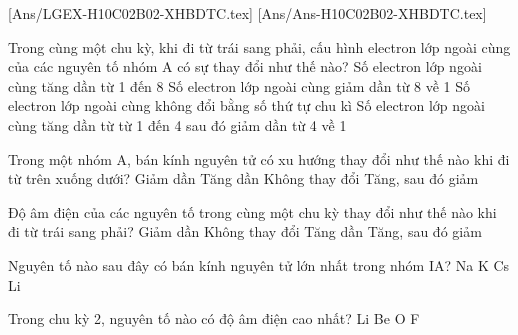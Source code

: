 [Ans/LGEX-H10C02B02-XHBDTC.tex]
[Ans/Ans-H10C02B02-XHBDTC.tex]

\begin{ex}%
	Trong cùng một chu kỳ, khi đi từ trái sang phải, cấu hình electron lớp ngoài cùng của các nguyên tố nhóm A có sự thay đổi như thế nào?
	\choice
	{\True Số electron lớp ngoài cùng tăng dần từ 1 đến 8}
	{Số electron lớp ngoài cùng giảm dần từ 8 về 1}
	{Số electron lớp ngoài cùng không đổi bằng số thứ tự chu kì}
	{Số electron lớp ngoài cùng tăng dần từ từ 1 đến 4 sau đó giảm dần từ 4 về 1}
\end{ex}
\begin{ex}%
	Trong một nhóm A, bán kính nguyên tử có xu hướng thay đổi như thế nào khi đi từ trên xuống dưới?
	\choice
	{Giảm dần}
	{\True Tăng dần}
	{Không thay đổi}
	{Tăng, sau đó giảm}
\end{ex}
\begin{ex}%
	Độ âm điện của các nguyên tố trong cùng một chu kỳ thay đổi như thế nào khi đi từ trái sang phải?
	\choice
	{Giảm dần}
	{Không thay đổi}
	{\True Tăng dần}
	{Tăng, sau đó giảm}
\end{ex}
\begin{ex}%
	Nguyên tố nào sau đây có bán kính nguyên tử lớn nhất trong nhóm IA?
	\choice
	{Na}
	{K}
	{\True Cs}
	{Li}
\end{ex}
\begin{ex}%
	Trong chu kỳ 2, nguyên tố nào có độ âm điện cao nhất?
	\choice
	{Li}
	{Be}
	{O}
	{\True F}
\end{ex}
